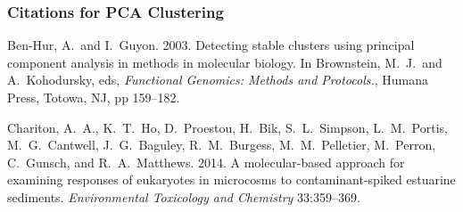\documentclass[10pt]{beamer}
\begin{document}
\begin{frame}
\frametitle{Citations for PCA Clustering}

\bi
\item Ben-Hur, A.~and I.~Guyon.  2003.  Detecting stable clusters
  using principal component analysis in methods in molecular biology.
  In Brownstein, M.~J.~and A.~Kohodursky, eds, {\em Functional
    Genomics: Methods and Protocols.}, Humana Press, Totowa, NJ, pp
  159--182.

\item Chariton, A.~A., K.~T.~Ho, D.~Proestou, H.~Bik, S.~L.~Simpson,
  L.~M.~Portis, M.~G.~Cantwell, J.~G.~Baguley, R.~M.~Burgess,
  M.~M.~Pelletier, M.~Perron, C.~Gunsch, and R.~A.~Matthews.  2014.  A
  molecular-based approach for examining responses of eukaryotes in
  microcosms to contaminant-spiked estuarine sediments.  {\em
    Environmental Toxicology and Chemistry} 33:359--369.
\ei
\end{frame}
\end{document}
